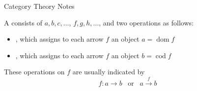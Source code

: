 \documentclass{mathnotes}
\DeclareMathOperator{\dom}{dom}
\DeclareMathOperator{\cod}{cod}
\begin{document}
\begin{center}
    \vspace*{20pt}
    \LARGE{Category Theory Notes}
\end{center}

\begin{defi}
    A  consists of  $a, b, c, \ldots$,
     $f, g, h, \ldots$, and two operations as follows:
    \begin{itemize}
        \item {}, which assigns to each arrow $f$ an object
            $a=\dom f$
        \item {}, which assigns to each arrow $f$ an object
            $b=\cod f$
    \end{itemize}
    These operations on $f$ are usually indicated by
    \[f:a\rightarrow b\hspace{10pt}\text{or}\hspace{10pt}a\xrightarrow{f}b\]
\end{defi}
\end{document}
